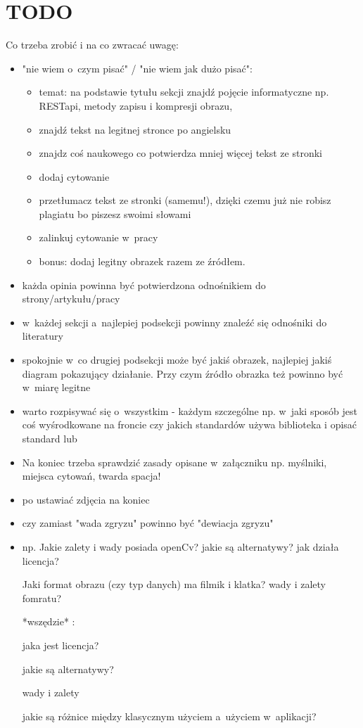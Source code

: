 \section{TODO}
Co trzeba zrobić i na co zwracać uwagę:
\begin{itemize}
\item "nie wiem o~czym pisać" / "nie wiem jak dużo pisać":
\begin{itemize}
    \item temat: na podstawie tytułu sekcji znajdź pojęcie informatyczne np. RESTapi, metody zapisu i kompresji obrazu, 
    \item znajdź tekst na legitnej stronce po angielsku
    \item znajdz coś naukowego co potwierdza mniej więcej tekst ze stronki
    \item dodaj cytowanie 
    \item przetłumacz tekst ze stronki (samemu!), dzięki czemu już nie robisz plagiatu bo piszesz swoimi słowami
    \item zalinkuj cytowanie w~pracy
    \item bonus: dodaj legitny obrazek razem ze źródłem.\cite{restapi}
\end{itemize}
    \item każda opinia powinna być potwierdzona odnośnikiem do strony/artykułu/pracy
    \item w~każdej sekcji a~najlepiej podsekcji powinny znaleźć się odnośniki do literatury
    \item spokojnie w~co drugiej podsekcji może być jakiś obrazek, najlepiej jakiś diagram pokazujący działanie. Przy czym źródło obrazka też powinno być w~miarę legitne
    \item warto rozpisywać się o~wszystkim - każdym szczególne np. w~jaki sposób jest coś wyśrodkowane na froncie czy jakich standardów używa biblioteka i opisać standard lub 
    \item Na koniec trzeba sprawdzić zasady opisane w~załączniku np. myślniki, miejsca cytowań, twarda spacja! 
    \item po ustawiać zdjęcia na koniec
    \item czy zamiast "wada zgryzu" powinno być "dewiacja zgryzu"
    \item np. Jakie zalety i wady posiada openCv? jakie są alternatywy? jak działa licencja?
    
Jaki format obrazu (czy typ danych) ma filmik i klatka? wady i zalety fomratu?

*wszędzie* :

jaka jest licencja?

jakie są alternatywy?

wady i  zalety

jakie są różnice między klasycznym użyciem a~użyciem w~aplikacji?

\end{itemize}
    
